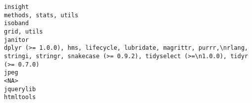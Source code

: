 \documentclass[
  letterpaper,
  DIV=11,
  numbers=noendperiod]{scrreprt}
\begin{document}
\begin{verbatim}
insight                                                                                                                                                                                                                                                                                                                                                                                                                                                                                                                                                                                              methods, stats, utils
isoband                                                                                                                                                                                                                                                                                                                                                                                                                                                                                                                                                                                                        grid, utils
janitor                                                                                                                                                                                                                                                                                                                                                                                                                                                             dplyr (>= 1.0.0), hms, lifecycle, lubridate, magrittr, purrr,\nrlang, stringi, stringr, snakecase (>= 0.9.2), tidyselect (>=\n1.0.0), tidyr (>= 0.7.0)
jpeg                                                                                                                                                                                                                                                                                                                                                                                                                                                                                                                                                                                                                  <NA>
jquerylib                                                                                                                                                                                                                                                                                                                                                                                                                                                                                                                                                                                                        htmltools

\end{verbatim}
\end{document}
